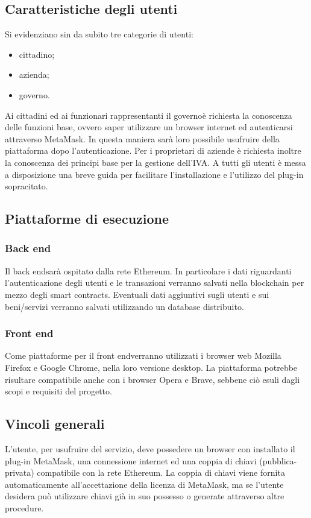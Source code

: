 \subsection{Caratteristiche degli utenti}
Si evidenziano sin da subito tre categorie di utenti:
\begin{itemize}
	\item cittadino;
	\item azienda;
	\item governo\glo.
\end{itemize}
Ai cittadini ed ai funzionari rappresentanti il governo\glosp è richiesta la conoscenza delle funzioni base, ovvero saper utilizzare un browser internet ed autenticarsi attraverso MetaMask\glo. In questa maniera sarà loro possibile usufruire  della piattaforma dopo l'autenticazione. Per i proprietari di aziende è richiesta inoltre la conoscenza dei principi base per la gestione dell'IVA. A tutti gli utenti è messa a disposizione una breve guida per facilitare l'installazione e l'utilizzo del plug-in sopracitato. 

\subsection{Piattaforme di esecuzione}
\subsubsection{Back end}
Il back end\glosp sarà ospitato dalla rete Ethereum\glo. In particolare i dati riguardanti l'autenticazione degli utenti e le transazioni verranno salvati nella blockchain per mezzo degli smart contracts\glo. Eventuali dati aggiuntivi sugli utenti e sui beni/servizi verranno salvati utilizzando un database distribuito.

\subsubsection{Front end}
Come piattaforme per il front end\glosp verranno utilizzati i browser web Mozilla Firefox e Google Chrome, nella loro versione desktop. La piattaforma potrebbe risultare compatibile anche con i browser Opera e Brave, sebbene ciò esuli dagli scopi e requisiti del progetto.

\subsection{Vincoli generali}
L’utente, per usufruire del servizio, deve possedere un browser con installato il plug-in MetaMask\glo, una connessione internet ed una coppia di chiavi (pubblica-privata) compatibile con la rete Ethereum\glo. La coppia di chiavi viene fornita automaticamente all'accettazione della licenza di MetaMask\glo, ma se l’utente desidera può utilizzare chiavi già in suo possesso o generate attraverso altre procedure.

 
